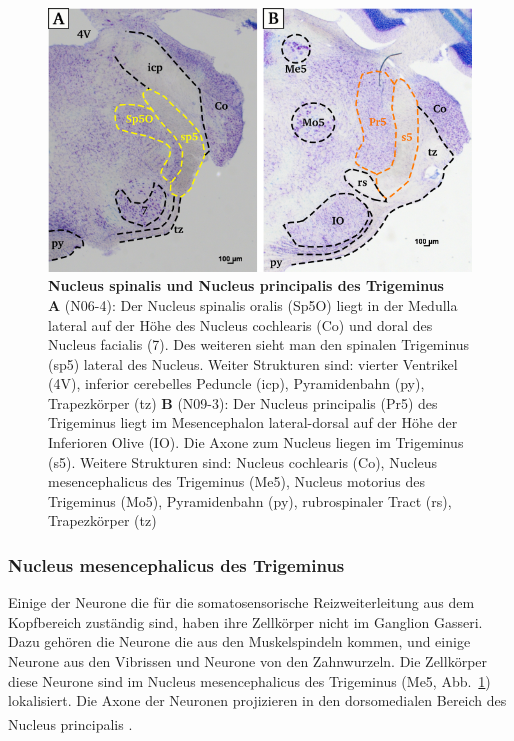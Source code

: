 \documentclass[12pt,a4paper,pdftex]{article}
\begin{document}
\begin{figure}[H]
    \centering
    \includegraphics[width = \textwidth]
    {pictures/somatosensory/somato_kopf.png}
    \caption[Nucleus spinalis und Nucleus principalis des Trigeminus]{\textbf{Nucleus spinalis und Nucleus principalis des Trigeminus}\\
     \textbf{A} (N06-4): Der Nucleus spinalis oralis (Sp5O) liegt in der Medulla lateral auf der Höhe des Nucleus cochlearis (Co) und doral des Nucleus facialis (7). Des weiteren sieht man den spinalen Trigeminus (sp5) lateral des Nucleus. Weiter Strukturen sind: vierter Ventrikel (4V), inferior cerebelles Peduncle (icp), Pyramidenbahn (py), Trapezkörper (tz)
     \textbf{B} (N09-3): Der Nucleus principalis (Pr5) des Trigeminus liegt im Mesencephalon lateral-dorsal auf der Höhe der Inferioren Olive (IO). Die Axone zum Nucleus liegen im Trigeminus (s5). Weitere Strukturen sind: Nucleus cochlearis (Co), Nucleus mesencephalicus des Trigeminus (Me5), Nucleus motorius des Trigeminus (Mo5),  Pyramidenbahn (py), rubrospinaler Tract (rs), Trapezkörper (tz)}
    \label{fig:somato_Pr5}
\end{figure}

\subsubsection*{Nucleus mesencephalicus des Trigeminus}
Einige der Neurone die für die somatosensorische Reizweiterleitung aus dem Kopfbereich zuständig sind, haben ihre Zellkörper nicht im Ganglion Gasseri. Dazu gehören die Neurone die aus den Muskelspindeln kommen, und einige Neurone aus den Vibrissen und Neurone von den Zahnwurzeln. Die Zellkörper diese Neurone sind im Nucleus mesencephalicus des Trigeminus (Me5, Abb.~\ref{fig:somato_Pr5}) lokalisiert. Die Axone der Neuronen projizieren in den dorsomedialen Bereich des Nucleus principalis  \textsuperscript{\cite[5]{heldmaier2003tierphysiologie}}.
\end{document}
